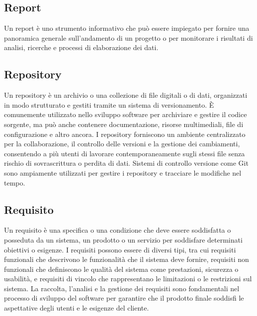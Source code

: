 \vspace{2em}
\subsection*{Report}
Un report è uno strumento informativo che può essere impiegato per fornire una panoramica generale sull’andamento di un progetto o per monitorare i risultati di analisi, ricerche e processi di elaborazione dei dati.

\vspace{2em}
\subsection*{Repository}
Un repository è un archivio o una collezione di file digitali o di dati, organizzati in modo strutturato e gestiti tramite un sistema di versionamento. È comunemente utilizzato nello sviluppo software per archiviare e gestire il codice sorgente, ma può anche contenere documentazione, risorse multimediali, file di configurazione e altro ancora. I repository forniscono un ambiente centralizzato per la collaborazione, il controllo delle versioni e la gestione dei cambiamenti, consentendo a più utenti di lavorare contemporaneamente sugli stessi file senza rischio di sovrascrittura o perdita di dati. Sistemi di controllo versione come Git sono ampiamente utilizzati per gestire i repository e tracciare le modifiche nel tempo.

\vspace{2em}
\subsection*{Requisito}
Un requisito è una specifica o una condizione che deve essere soddisfatta o posseduta da un sistema, un prodotto o un servizio per soddisfare determinati obiettivi o esigenze. I requisiti possono essere di diversi tipi, tra cui requisiti funzionali che descrivono le funzionalità che il sistema deve fornire, requisiti non funzionali che definiscono le qualità del sistema come prestazioni, sicurezza o usabilità, e requisiti di vincolo che rappresentano le limitazioni o le restrizioni sul sistema. La raccolta, l'analisi e la gestione dei requisiti sono fondamentali nel processo di sviluppo del software per garantire che il prodotto finale soddisfi le aspettative degli utenti e le esigenze del cliente.

\vspace{2em}
